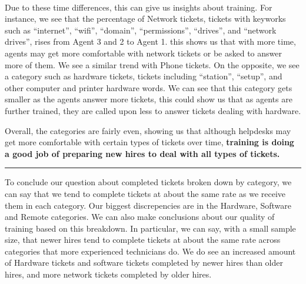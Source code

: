 \documentclass[11pt]{article}
\begin{document}
    \begin{center}
    \end{center}
    { \hspace*{\fill} \\}
    
    Due to these time differences, this can give us insights about training.
For instance, we see that the percentage of Network tickets, tickets
with keyworks such as ``internet'', ``wifi'', ``domain'',
``permissions'', ``drives'', and ``network drives'', rises from Agent 3
and 2 to Agent 1. this shows us that with more time, agents may get more
comfortable with network tickets or be asked to answer more of them. We
see a similar trend with Phone tickets. On the opposite, we see a
category such as hardware tickets, tickets including ``station'',
``setup'', and other computer and printer hardware words. We can see
that this category gets smaller as the agents answer more tickets, this
could show us that as agents are further trained, they are called upon
less to answer tickets dealing with hardware.

Overall, the categories are fairly even, showing us that although
helpdesks may get more comfortable with certain types of tickets over
time, \textbf{training is doing a good job of preparing new hires to
deal with all types of tickets.}

\begin{center}\rule{0.5\linewidth}{\linethickness}\end{center}

To conclude our question about completed tickets broken down by
category, we can say that we tend to complete tickets at about the same
rate as we receive them in each category. Our biggest discrepencies are
in the Hardware, Software and Remote categories. We can also make
conclusions about our quality of training based on this breakdown. In
particular, we can say, with a small sample size, that newer hires tend
to complete tickets at about the same rate across categories that more
experienced technicians do. We do see an increased amount of Hardware
tickets and software tickets completed by newer hires than older hires,
and more network tickets completed by older hires.



    
\end{document}
